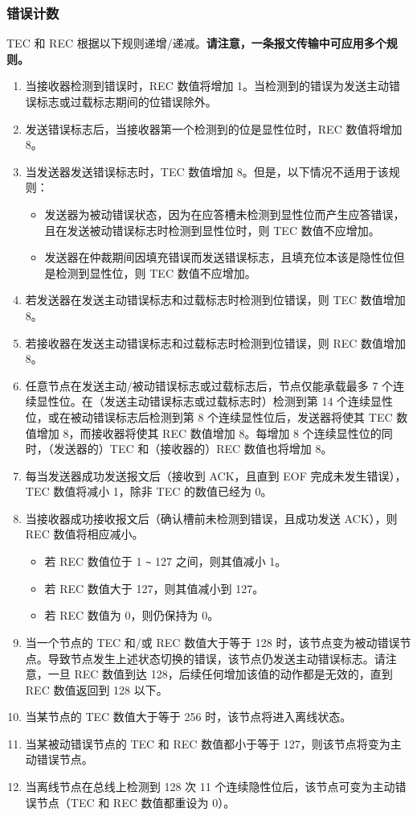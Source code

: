 \documentclass[main\_\_CN.tex]{subfiles}
\begin{document}
\subsubsection{错误计数}

TEC 和 REC 根据以下规则递增/递减。\textbf{请注意，一条报文传输中可应用多个规则。}

\begin{enumerate}
    \item 当接收器检测到错误时，REC 数值将增加 1。当检测到的错误为发送主动错误标志或过载标志期间的位错误除外。
    \item 发送错误标志后，当接收器第一个检测到的位是显性位时，REC 数值将增加 8。
    \item 当发送器发送错误标志时，TEC 数值增加 8。但是，以下情况不适用于该规则：
    \begin{itemize}
        \item 发送器为被动错误状态，因为在应答槽未检测到显性位而产生应答错误，且在发送被动错误标志时检测到显性位时，则 TEC 数值不应增加。
        \item 发送器在仲裁期间因填充错误而发送错误标志，且填充位本该是隐性位但是检测到显性位，则 TEC 数值不应增加。
    \end{itemize}
    \item 若发送器在发送主动错误标志和过载标志时检测到位错误，则 TEC 数值增加 8。
    \item 若接收器在发送主动错误标志和过载标志时检测到位错误，则 REC 数值增加 8。
    \item 任意节点在发送主动/被动错误标志或过载标志后，节点仅能承载最多 7 个连续显性位。在（发送主动错误标志或过载标志时）检测到第 14 个连续显性位，或在被动错误标志后检测到第 8 个连续显性位后，发送器将使其 TEC 数值增加 8，而接收器将使其 REC 数值增加 8。每增加 8 个连续显性位的同时，（发送器的）TEC 和（接收器的）REC 数值也将增加 8。
    \item 每当发送器成功发送报文后（接收到 ACK，且直到 EOF 完成未发生错误），TEC 数值将减小 1，除非 TEC 的数值已经为 0。
    \item 当接收器成功接收报文后（确认槽前未检测到错误，且成功发送 ACK），则 REC 数值将相应减小。
    \begin{itemize}
        \item 若 REC 数值位于 1 \verb+~+ 127 之间，则其值减小 1。
        \item 若 REC 数值大于 127，则其值减小到 127。
        \item 若 REC 数值为 0，则仍保持为 0。
    \end{itemize}
    \item 当一个节点的 TEC 和/或 REC 数值大于等于 128 时，该节点变为被动错误节点。导致节点发生上述状态切换的错误，该节点仍发送主动错误标志。请注意，一旦 REC 数值到达 128，后续任何增加该值的动作都是无效的，直到 REC 数值返回到 128 以下。
    \item 当某节点的 TEC 数值大于等于 256 时，该节点将进入离线状态。
    \item 当某被动错误节点的 TEC 和 REC 数值都小于等于 127，则该节点将变为主动错误节点。
    \item 当离线节点在总线上检测到 128 次 11 个连续隐性位后，该节点可变为主动错误节点（TEC 和 REC 数值都重设为 0）。
\end{enumerate}
\end{document}
